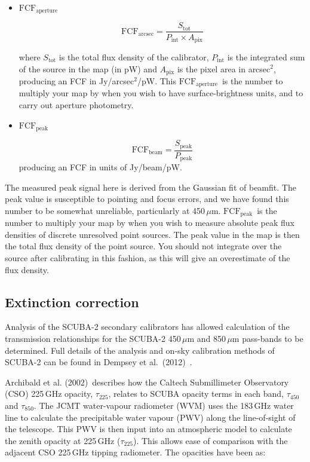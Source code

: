 \documentclass[twoside,11pt]{article}
\newcommand{\xref}[3]{#1}
\newcommand{\xlabel}[1]{}
\renewcommand{\_}{\texttt{\symbol{95}}}
\newcommand{\fcfb}{$\mathrm{FCF_{peak}}$}
\newcommand{\fcfa}{$\mathrm{FCF_{aperture}}$}
\newcommand{\task}[1]{\textsf{#1}}
\newcommand{\beamfit}{\xref{\task{beamfit}}{sun95}{BEAMFIT}}
\begin{document}
\begin{itemize}

\item{\textbf{\fcfa}}

\begin{equation}
\label{eq:fcf_arcsec}
\mathrm{FCF_{arcsec}} = \frac{S_\mathrm{tot}}{P_\mathrm{int} \times
A_\mathrm{pix}}
\end{equation}

where $S_\mathrm{tot}$ is the total flux density of the calibrator,
$P_\mathrm{int}$ is the integrated sum of the source in the map (in
pW) and $A_\mathrm{pix}$ is the pixel area in arcsec$^2$, producing an
FCF in Jy/arcsec$^2$/pW. This \fcfa\ is the number to
multiply your map by when you wish to have surface-brightness units,
and to carry out aperture photometry.

\item{\textbf{\fcfb}}

\begin{equation}
\label{eq:fcf_beam}
\mathrm{FCF_{beam}} = \frac{S_\mathrm{{peak}}}{P_\mathrm{peak}}
\end{equation}
producing an FCF in units of Jy/beam/pW.
\end{itemize}

The measured peak signal here is derived from the Gaussian fit of
\beamfit. The peak value is susceptible to pointing and focus errors,
and we have found this number to be somewhat unreliable, particularly
at 450\,$\mu$m. \fcfb\ is the number to multiply your
map by when you wish to measure absolute peak flux densities of
discrete unresolved point sources. The peak value in the map is then
the total flux density of the point source. You should not integrate
over the source after calibrating in this fashion, as this will give
an overestimate of the flux density.


\subsection{\xlabel{extinction}Extinction correction}

Analysis of the SCUBA-2 secondary calibrators has allowed calculation
of the transmission relationships for the SCUBA-2 450\,$\mu$m and
850\,$\mu$m pass-bands to be determined. Full details of the analysis
and on-sky calibration methods of SCUBA-2 can be found in Dempsey et
al.\ (2012)~\cite{dempsey12}\cite{dempsey-spie}.

Archibald et al. (2002)\,\cite{archibald} describes how the Caltech
Submillimeter Observatory (CSO) 225\,GHz opacity, $\tau_{225}$,
relates to SCUBA opacity terms in each band, $\tau_{450}$ and
$\tau_{850}$. The JCMT water-vapour radiometer (WVM) uses the 183\,GHz
water line to calculate the precipitable water vapour (PWV) along the
line-of-sight of the telescope. This PWV is then input into an
atmospheric model to calculate the zenith opacity at 225\,GHz
($\tau_{225}$). This allows ease of comparison with the adjacent CSO
225\,GHz tipping radiometer. The opacities have been as:
\end{document}
